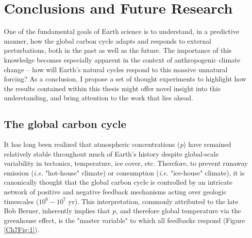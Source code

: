 \chapter{Conclusions and Future Research}
\label{Ch7}

\raggedbottom
\clearpage

One of the fundamental goals of Earth science is to understand, in a predictive manner, how the global carbon cycle adapts and responds to external perturbations, both in the past as well as the future. The importance of this knowledge becomes especially apparent in the context of anthropogenic climate change -- how will Earth's natural cycles respond to this massive unnatural forcing? As a conclusion, I propose a set of thought experiments to highlight how the results contained within this thesis might offer novel insight into this understanding, and bring attention to the work that lies ahead.

\section{The global carbon cycle}

It has long been realized that atmospheric  concentrations (\textit{p}) have remained relatively stable throughout much of Earth's history despite global-scale variability in tectonics, temperature, ice cover, etc. Therefore, to prevent runaway  emission (\textit{i.e.} "hot-house" climate) or consumption (\textit{i.e.} "ice-house" climate), it is canonically thought that the global carbon cycle is controlled by an intricate network of positive and negative feedback mechanisms acting over geologic timescales ($10^6 - 10^7$ yr). This interpretation, commonly attributed to the late Bob Berner, inherently implies that \textit{p}, and therefore global temperature via the greenhouse effect, is the "master variable" to which all feedbacks respond (Figure \ref{Ch7Fig:1}).


